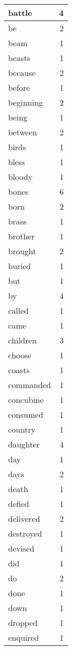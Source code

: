 \begin{center}
\begin{longtable}{l|r}
battle & 4 \\ \hline
be & 2 \\ \hline
beam & 1 \\ \hline
beasts & 1 \\ \hline
because & 2 \\ \hline
before & 1 \\ \hline
beginning & 2 \\ \hline
being & 1 \\ \hline
between & 2 \\ \hline
birds & 1 \\ \hline
bless & 1 \\ \hline
bloody & 1 \\ \hline
bones & 6 \\ \hline
born & 2 \\ \hline
brass & 1 \\ \hline
brother & 1 \\ \hline
brought & 2 \\ \hline
buried & 1 \\ \hline
but & 1 \\ \hline
by & 4 \\ \hline
called & 1 \\ \hline
came & 1 \\ \hline
children & 3 \\ \hline
choose & 1 \\ \hline
coasts & 1 \\ \hline
commanded & 1 \\ \hline
concubine & 1 \\ \hline
consumed & 1 \\ \hline
country & 1 \\ \hline
daughter & 4 \\ \hline
day & 1 \\ \hline
days & 2 \\ \hline
death & 1 \\ \hline
defied & 1 \\ \hline
delivered & 2 \\ \hline
destroyed & 1 \\ \hline
devised & 1 \\ \hline
did & 1 \\ \hline
do & 2 \\ \hline
done & 1 \\ \hline
down & 1 \\ \hline
dropped & 1 \\ \hline
enquired & 1 \\ \hline

\end{longtable}
\end{center}
